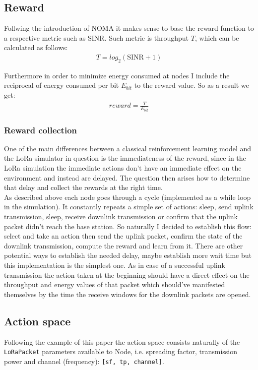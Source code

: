 \subsection{Reward}

Follwing the introduction of NOMA it makes sense to base
the reward function to a respective metric such as SINR.
Such metric is throughput $T$, which can be calculated as follows: 
\begin{align}
T = log_2(\text{SINR}+ 1)
\end{align}

Furthermore in order to minimize energy consumed at nodes I 
include the reciprocal of energy consumed per bit $E_{bit}$ to the reward
value. So as a result we get:
\begin{align}
    reward = \frac{T}{E_{bit}}
\end{align}

\subsubsection{Reward collection}

One of the main differences between a classical reinforcement
learning model and the LoRa simulator in question is the immediateness of the reward, since in the LoRa simulation the immediate actions don't have an immediate effect on the environment and instead are delayed. The question then arises how to determine that delay and collect the rewards at the right time. \\

As described above each node goes through a cycle (implemented 
as a while loop in the simulation). It constantly repeats
a simple set of actions: sleep, send uplink transmission, sleep,
receive downlink transmission or confirm that the uplink 
packet didn't reach the base station. So naturally I decided to establish this flow:
select and take an action then send the uplink packet,
confirm the state of the downlink transmission, compute
the reward and learn from it. There are other potential 
ways to establish the needed delay, maybe 
establish more wait time but this implementation is the 
simplest one. As in case of a successful uplink transmission
the action taken at the beginning should have a direct effect on the throughput and energy values of that packet 
which should've manifested themselves by the time the receive
windows for the downlink packets are opened. 

\subsection{Action space}
Following the example of this paper \cite{rl_lora_original} the action space consists naturally of the \texttt{LoRaPacket} 
parameters available to Node, i.e. spreading factor,
transmission power and channel (frequency): 
\texttt{[sf, tp, channel]}. \\

